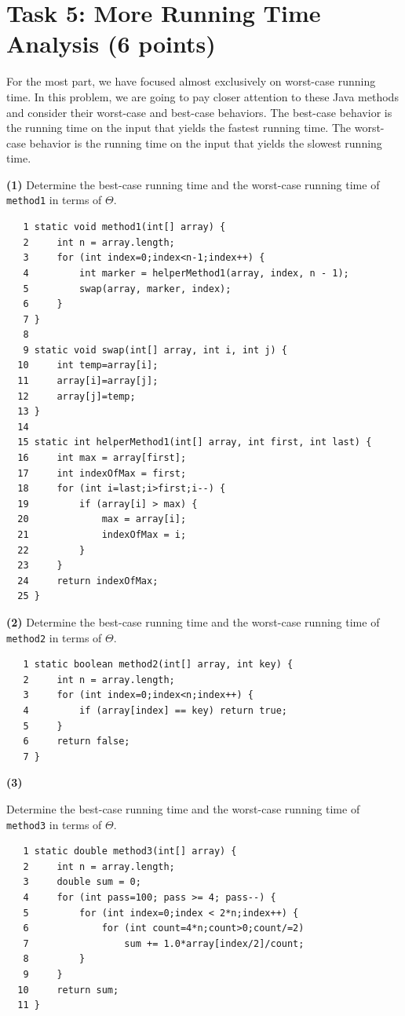 \documentclass{article}
\theoremstyle{remark}
\begin{document}
\section*{Task 5: More Running Time Analysis (6 points)}

For the most part, we have focused almost exclusively on worst-case running time. In this problem, we are going to pay closer attention to these Java methods and consider their worst-case and best-case behaviors. The best-case behavior is the running time on the input that yields the fastest running time. The worst-case behavior is the running time on the input that yields the slowest running time.

\textbf{(1)} Determine the best-case running time and the worst-case running time of \texttt{method1} in terms of $\Theta$.

\begin{verbatim}
   1 static void method1(int[] array) {
   2     int n = array.length;
   3     for (int index=0;index<n-1;index++) {
   4         int marker = helperMethod1(array, index, n - 1);
   5         swap(array, marker, index);
   6     }
   7 }
   8
   9 static void swap(int[] array, int i, int j) {
  10     int temp=array[i];
  11     array[i]=array[j];
  12     array[j]=temp;
  13 }
  14
  15 static int helperMethod1(int[] array, int first, int last) {
  16     int max = array[first];
  17     int indexOfMax = first;
  18     for (int i=last;i>first;i--) {
  19         if (array[i] > max) {
  20             max = array[i];
  21             indexOfMax = i;
  22         }
  23     }
  24     return indexOfMax;
  25 }
\end{verbatim}

\textbf{(2)} Determine the best-case running time and the worst-case running time of \texttt{method2} in terms of $\Theta$.

\begin{verbatim}
   1 static boolean method2(int[] array, int key) {
   2     int n = array.length;
   3     for (int index=0;index<n;index++) {
   4         if (array[index] == key) return true;
   5     }
   6     return false;
   7 }
  \end{verbatim}
\textbf{(3)} 

Determine the best-case running time and the worst-case running time of \texttt{method3} in terms of $\Theta$.

\begin{verbatim}
   1 static double method3(int[] array) {
   2     int n = array.length;
   3     double sum = 0;
   4     for (int pass=100; pass >= 4; pass--) {
   5         for (int index=0;index < 2*n;index++) {
   6             for (int count=4*n;count>0;count/=2)
   7                 sum += 1.0*array[index/2]/count;
   8         }
   9     }
  10     return sum;
  11 }
\end{verbatim}
\end{document}
